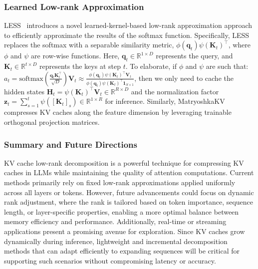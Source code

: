 \subsubsection{Learned Low-rank Approximation}\label{sssec:kv_low_rank_learned}
LESS~\cite{dong2024get} introduces a novel {learned-kernel-based low-rank approximation} approach to efficiently approximate the results of the softmax function. Specifically, LESS~\cite{dong2024get} replaces the softmax with a {separable similarity metric}, \(\phi(\mathbf{q}_t) \psi(\mathbf{K}_t)^\top\), where \(\phi\) and \(\psi\) are row-wise functions. Here, \(\mathbf{q}_t \in \mathbb{R}^{1 \times D}\) represents the query, and \(\mathbf{K}_t \in \mathbb{R}^{t \times D}\) represents the keys at step \(t\).
To elaborate, if \(\phi\) and \(\psi\) are such that:
$a_t = \text{softmax} \left( \frac{\mathbf{q}_t \mathbf{K}_t^\top}{\sqrt{D}} \right) \mathbf{V}_t 
\approx \frac{\phi(\mathbf{q}_t) \psi(\mathbf{K}_t)^\top \mathbf{V}_t}{\phi(\mathbf{q}_t) \psi(\mathbf{K}_t)^\top \mathbf{1}_{S \times 1}}$,
then we only need to cache the {hidden states} \(\mathbf{H}_t = \psi(\mathbf{K}_t)^\top \mathbf{V}_t \in \mathbb{R}^{R \times D}\) and the {normalization factor} \(\mathbf{z}_t = \sum_{s=1}^t \psi([\mathbf{K}_t]_s) \in \mathbb{R}^{1 \times R}\) for inference.
Similarly,
MatryoshkaKV~\cite{linMatryoshkaKVAdaptiveKV2024} 
compresses KV caches along the feature dimension by leveraging trainable orthogonal projection matrices.


\subsubsection{Summary and Future Directions}
KV cache low-rank decomposition is a powerful technique for compressing KV caches in LLMs while maintaining the quality of attention computations. Current methods primarily rely on fixed low-rank approximations applied uniformly across all layers or tokens. However, future advancements could focus on dynamic rank adjustment, where the rank is tailored based on token importance, sequence length, or layer-specific properties, enabling a more optimal balance between memory efficiency and performance.
Additionally, real-time or streaming applications present a promising avenue for exploration. Since KV caches grow dynamically during inference, lightweight and incremental decomposition methods that can adapt efficiently to expanding sequences will be critical for supporting such scenarios without compromising latency or accuracy.





 
